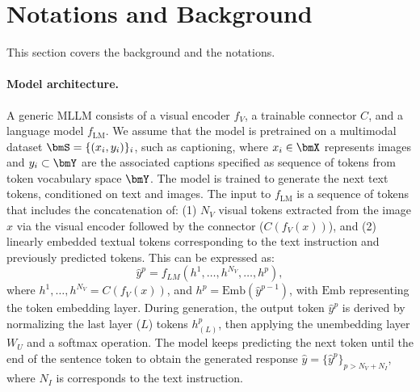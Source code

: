 



\section{Notations and Background}
\label{sec:framework}



This section covers the background and the notations.



\paragraph{Model architecture.} A generic MLLM consists of a visual encoder \( f_V \), a trainable connector \( C \), and a language model \( f_{\text{LM}} \). We assume that the model is pretrained on a multimodal dataset \( \bmS = \{(x_i, y_i)\}_i \), such as captioning, where \( x_i \in \bmX \) represents images and \( y_i \subset \bmY \) are the associated captions specified as sequence of tokens from token vocabulary space $\bmY$. The model is trained to generate the next text tokens, conditioned on text and images. The input to \( f_{\text{LM}} \) is a sequence of tokens that includes the concatenation of: (1) $N_V$ visual tokens extracted from the image $x$ via the visual encoder followed by the connector ($C(f_V(x))$), and (2) linearly embedded textual tokens corresponding to the text instruction and previously predicted tokens. This can be expressed as:
$$
    \hat{y}^p = f_{LM}(h^{1}, \dots, h^{N_V}, \dots, h^{p}),
$$
where $h^{1}, \dots, h^{N_V} = C(f_V(x))$, and $h^p = \text{Emb}(\hat{y}^{p-1})$, with $\text{Emb}$ representing the token embedding layer. During generation, the output token $\hat{y}^p$ is derived by normalizing the last layer ($L$) tokens $h^p_{(L)}$, then applying the unembedding layer $W_U$ and a softmax operation. 
The model keeps predicting the next token until the end of the sentence token to obtain the generated response $\hat{y} = \{\hat{y}^p\}_{p>N_V+N_I}$, where $N_I$ is corresponds to the text instruction.













 











